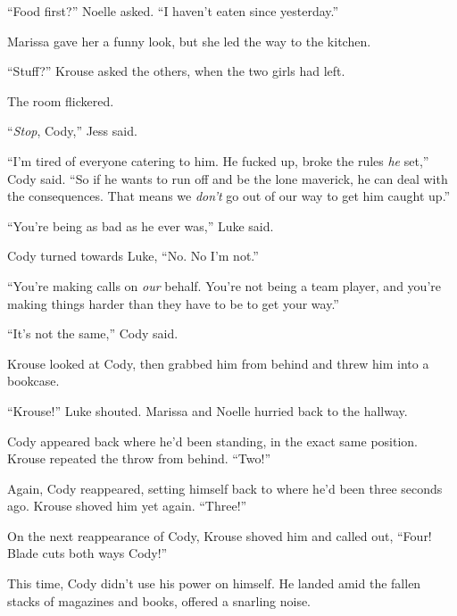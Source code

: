 ``Food first?'' Noelle asked.  ``I haven't eaten since yesterday.''



Marissa gave her a funny look, but she led the way to the kitchen.



``Stuff?'' Krouse asked the others, when the two girls had left.



The room flickered.



``\emph{Stop}, Cody,'' Jess said.



``I'm tired of everyone catering to him.  He fucked up, broke the rules \emph{he} set,'' Cody said.  ``So if he wants to run off and be the lone maverick, he can deal with the consequences.  That means we \emph{don't} go out of our way to get him caught up.''



``You're being as bad as he ever was,'' Luke said.



Cody turned towards Luke, ``No.  No I'm not.''



``You're making calls on \emph{our} behalf.  You're not being a team player, and you're making things harder than they have to be to get your way.''



``It's not the same,'' Cody said.



Krouse looked at Cody, then grabbed him from behind and threw him into a bookcase.



``Krouse!'' Luke shouted.  Marissa and Noelle hurried back to the hallway.



Cody appeared back where he'd been standing, in the exact same position.  Krouse repeated the throw from behind.  ``Two!''



Again, Cody reappeared, setting himself back to where he'd been three seconds ago.  Krouse shoved him yet again.  ``Three!''



On the next reappearance of Cody, Krouse shoved him and called out, ``Four!  Blade cuts both ways Cody!''



This time, Cody didn't use his power on himself.  He landed amid the fallen stacks of magazines and books, offered a snarling noise.



